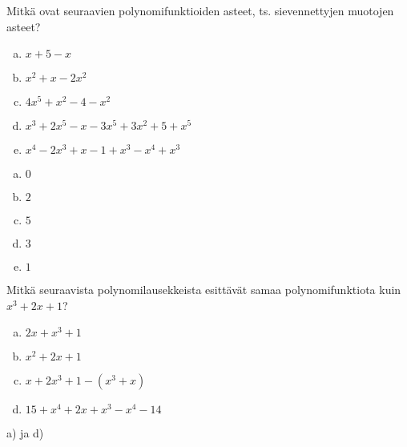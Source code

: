 \begin{tehtava}
	Mitkä ovat seuraavien polynomifunktioiden asteet, ts. sievennettyjen muotojen asteet?
	\begin{enumerate}[a)]
		\item $x+5-x$
		\item $x^2+x-2x^2$
		\item $4x^5+x^2-4-x^2$
		\item $x^3+2x^5-x-3x^5+3x^2+5+x^5$
		\item $x^4-2x^3+x-1+x^3-x^4+x^3$
	\end{enumerate}

	\begin{vastaus}
		\begin{enumerate}[a)]
			\item $0$
			\item $2$
			\item $5$
			\item $3$
			\item $1$
		\end{enumerate}
	\end{vastaus}
\end{tehtava}

%

\begin{tehtava}
	Mitkä seuraavista polynomilausekkeista esittävät samaa polynomifunktiota kuin
	$x^3+2x+1$?
	\begin{enumerate}[a)]
		\item $2x+x^3+1$
		\item $x^2+2x+1$
		\item $x+2x^3+1 - (x^3+x)$
		\item $15+x^4+2x+x^3-x^4-14$
	\end{enumerate}
	\begin{vastaus}
		a) ja d)
	\end{vastaus}
\end{tehtava}
